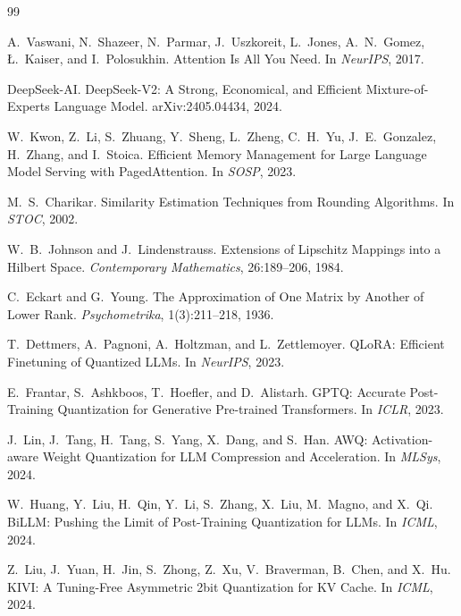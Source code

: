 \documentclass[11pt]{article}
\theoremstyle{plain}
\theoremstyle{definition}
\begin{document}
\begin{thebibliography}{99}
\setlength{\itemsep}{2pt}

 A.~Vaswani, N.~Shazeer, N.~Parmar, J.~Uszkoreit,
L.~Jones, A.~N.~Gomez, {\L}.~Kaiser, and I.~Polosukhin.
\newblock Attention Is All You Need.
\newblock In \emph{NeurIPS}, 2017.

 DeepSeek-AI.
\newblock DeepSeek-V2: A Strong, Economical, and Efficient
Mixture-of-Experts Language Model.
\newblock arXiv:2405.04434, 2024.

 W.~Kwon, Z.~Li, S.~Zhuang, Y.~Sheng, L.~Zheng,
C.~H.~Yu, J.~E.~Gonzalez, H.~Zhang, and I.~Stoica.
\newblock Efficient Memory Management for Large Language Model Serving
with PagedAttention.
\newblock In \emph{SOSP}, 2023.

 M.~S.~Charikar.
\newblock Similarity Estimation Techniques from Rounding Algorithms.
\newblock In \emph{STOC}, 2002.

 W.~B.~Johnson and J.~Lindenstrauss.
\newblock Extensions of Lipschitz Mappings into a Hilbert Space.
\newblock \emph{Contemporary Mathematics}, 26:189--206, 1984.

 C.~Eckart and G.~Young.
\newblock The Approximation of One Matrix by Another of Lower Rank.
\newblock \emph{Psychometrika}, 1(3):211--218, 1936.

 T.~Dettmers, A.~Pagnoni, A.~Holtzman, and L.~Zettlemoyer.
\newblock QLoRA: Efficient Finetuning of Quantized LLMs.
\newblock In \emph{NeurIPS}, 2023.

 E.~Frantar, S.~Ashkboos, T.~Hoefler, and D.~Alistarh.
\newblock GPTQ: Accurate Post-Training Quantization for Generative
Pre-trained Transformers.
\newblock In \emph{ICLR}, 2023.

 J.~Lin, J.~Tang, H.~Tang, S.~Yang, X.~Dang, and S.~Han.
\newblock AWQ: Activation-aware Weight Quantization for LLM Compression
and Acceleration.
\newblock In \emph{MLSys}, 2024.

 W.~Huang, Y.~Liu, H.~Qin, Y.~Li, S.~Zhang, X.~Liu,
M.~Magno, and X.~Qi.
\newblock BiLLM: Pushing the Limit of Post-Training Quantization for
LLMs.
\newblock In \emph{ICML}, 2024.

 Z.~Liu, J.~Yuan, H.~Jin, S.~Zhong, Z.~Xu, V.~Braverman,
B.~Chen, and X.~Hu.
\newblock KIVI: A Tuning-Free Asymmetric 2bit Quantization for KV Cache.
\newblock In \emph{ICML}, 2024.


\end{thebibliography}
\end{document}
